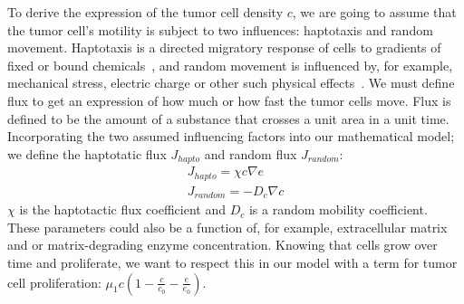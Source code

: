 To derive the expression of the tumor cell density $c$, we are going to assume that the tumor cell's motility is subject to two influences: haptotaxis and random movement. Haptotaxis is a directed migratory response of cells to gradients of fixed or bound chemicals~\cite{anderson_continuous_1998}, and random movement is influenced by, for example, mechanical stress, electric charge or other such physical effects~\cite{Merino-Casallo2022-di}. We must define flux to get an expression of how much or how fast the tumor cells move. Flux is defined to be the amount of a substance that crosses a unit area in a unit time. Incorporating the two assumed influencing factors into our mathematical model; we define the haptotatic flux $J_{hapto}$ and random flux $J_{random}$:
\begin{align*}
    J_{hapto} = \chi c \nabla e \\
    J_{random} = -D_c \nabla c
\end{align*}
$\chi$ is the haptotactic flux coefficient and $D_c$ is a random mobility coefficient. These parameters could also be a function of, for example, extracellular matrix and or matrix-degrading enzyme concentration. Knowing that cells grow over time and proliferate, we want to respect this in our model with a term for tumor cell proliferation: $\mu_1 c (1-\frac{c}{c_0} - \frac{e}{e_0})$.

